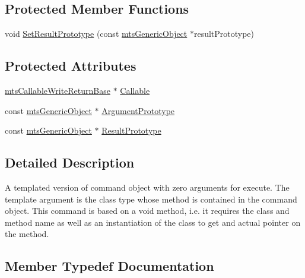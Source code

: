 \subsection*{Protected Member Functions}
\begin{DoxyCompactItemize}
\item 
void \hyperlink{classmts_command_write_return_a23691915a84b24a9eb08e75ed8b347c2}{Set\+Result\+Prototype} (const \hyperlink{classmts_generic_object}{mts\+Generic\+Object} $\ast$result\+Prototype)
\end{DoxyCompactItemize}
\subsection*{Protected Attributes}
\begin{DoxyCompactItemize}
\item 
\hyperlink{classmts_callable_write_return_base}{mts\+Callable\+Write\+Return\+Base} $\ast$ \hyperlink{classmts_command_write_return_ada842b5e68290a2c53de66702025f4ab}{Callable}
\item 
const \hyperlink{classmts_generic_object}{mts\+Generic\+Object} $\ast$ \hyperlink{classmts_command_write_return_a21b712fb9036e3dfad2d67c5f15932d2}{Argument\+Prototype}
\item 
const \hyperlink{classmts_generic_object}{mts\+Generic\+Object} $\ast$ \hyperlink{classmts_command_write_return_a02ec49cd66e7d95bd1ac9d08e5eb8cae}{Result\+Prototype}
\end{DoxyCompactItemize}


\subsection{Detailed Description}
A templated version of command object with zero arguments for execute. The template argument is the class type whose method is contained in the command object. This command is based on a void method, i.\+e. it requires the class and method name as well as an instantiation of the class to get and actual pointer on the method. 

\subsection{Member Typedef Documentation}
\hypertarget{classmts_command_write_return_a77f6a3a0512f7914b99f53dfe307a798}{}
